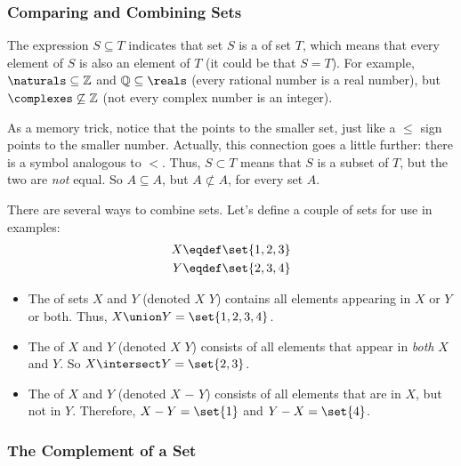 \subsubsection{Comparing and Combining Sets}

The expression $S \subseteq T$ indicates that set $S$ is a 
of set $T$, which means that every element of $S$ is also an element of
$T$ (it could be that $S=T$).  For example, $\naturals \subseteq
\mathbb{Z}$ and $\mathbb{Q} \subseteq
\reals$ (every rational number is a real number), but $\complexes
\not\subseteq \mathbb{Z}$ (not every complex number is an integer).

As a memory trick, notice that the \term{$\subseteq$} points to the
smaller set, just like a $\leq$ sign points to the smaller number.
Actually, this connection goes a little further: there is a symbol
\term{$\subset$} analogous to $<$.  Thus, $S \subset T$ means that $S$
is a subset of $T$, but the two are \emph{not} equal.  So $A \subseteq
A$, but $A \not\subset A$, for every set $A$.

There are several ways to combine sets.  Let's define a couple of sets for
use in examples:
\begin{align*}
X & \eqdef \set{1, 2, 3} \\
Y & \eqdef \set{2, 3, 4}
\end{align*}

\begin{itemize}

\item The  of sets $X$ and $Y$ (denoted $X$ \term{$\union$} $Y$)
contains all elements appearing in $X$ or $Y$ or both.  Thus, $X \union
Y = \set{1, 2, 3, 4}$.

\item The  of $X$ and $Y$ (denoted $X$
  \term{$\intersect$} $Y$) consists of all elements that appear in
  \textit{both} $X$ and $Y$.  So $X \intersect Y = \set{2, 3}$.

\item The  of $X$ and $Y$ (denoted $X$ $-$ $Y$) consists of all elements that are in $X$, but not in $Y$.
  Therefore, $X - Y = \set{1}$ and $Y - X = \set{4}$.

\end{itemize}

\subsubsection{The Complement of a Set}

